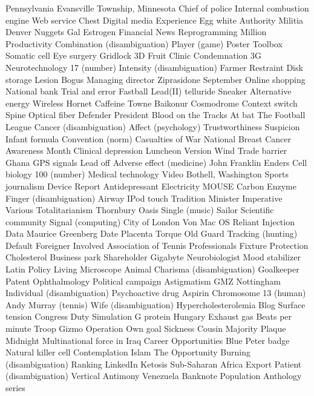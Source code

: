 Pennsylvania  Evansville Township, Minnesota  Chief of police  
Internal combustion engine  Web service  Chest  
Digital media  Experience  Egg white  
Authority  Militia  Denver Nuggets  
Gal  Estrogen  Financial News  
Reprogramming  Million  Productivity  
Combination (disambiguation)  Player (game)  Poster  
Toolbox  Somatic cell  Eye surgery  
Gridlock  3D  Fruit  
Clinic  Condemnation  3G  
Neurotechnology  17 (number)  Intensity (disambiguation)  
Farmer  Restraint  Disk storage  
Lesion  Bogus  Managing director  
Ziprasidone  September  Online shopping  
National bank  Trial and error  Fastball  
Lead(II) telluride  Sneaker  Alternative energy  
Wireless  Hornet  Caffeine  
Towne  Baikonur Cosmodrome  Context switch  
Spine  Optical fiber  Defender  
President  Blood on the Tracks  At bat  
The Football League  Cancer (disambiguation)  Affect (psychology)  
Trustworthiness  Suspicion  Infant formula  
Convention (norm)  Casualties of War  National Breast Cancer Awareness Month  
Clinical depression  Luncheon  Version  
Wind  Trade barrier  Ghana  
GPS signals  Lead off  Adverse effect (medicine)  
John Franklin Enders  Cell biology  100 (number)  
Medical technology  Video  Bothell, Washington  
Sports journalism  Device  Report  
Antidepressant  Electricity  MOUSE  
Carbon  Enzyme  Finger (disambiguation)  
Airway  IPod touch  Tradition  
Minister  Imperative  Various  
Totalitarianism  Thornbury  Oasis  
Single (music)  Sailor  Scientific community  
Signal (computing)  City of London  Von  
Mac OS  Reliant  Injection  
Data  Maurice Greenberg  Date  
Placenta  Torque  Old  
Guard  Tracking (hunting)  Default  
Foreigner  Involved  Association of Tennis Professionals  
Fixture  Protection  Cholesterol  
Business park  Shareholder  Gigabyte  
Neurobiologist  Mood stabilizer  Latin  
Policy  Living  Microscope  
Animal  Charisma (disambiguation)  Goalkeeper  
Patent  Ophthalmology  Political campaign  
Astigmatism  GMZ  Nottingham  
Individual (disambiguation)  Psychoactive drug  Aspirin  
Chromosome 13 (human)  Andy Murray (tennis)  Wife (disambiguation)  
Hypercholesterolemia  Blog  Surface tension  
Congress  Duty  Simulation  
G protein  Hungary  Exhaust gas  
Beats per minute  Troop  Gizmo  
Operation  Own goal  Sickness  
Cousin  Majority  Plaque  
Midnight  Multinational force in Iraq  Career Opportunities  
Blue Peter badge  Natural killer cell  Contemplation  
Islam  The Opportunity  Burning (disambiguation)  
Ranking  LinkedIn  Ketosis  
Sub-Saharan Africa  Export  Patient (disambiguation)  
Vertical  Antimony  Venezuela  
Banknote  Population  Anthology series  
